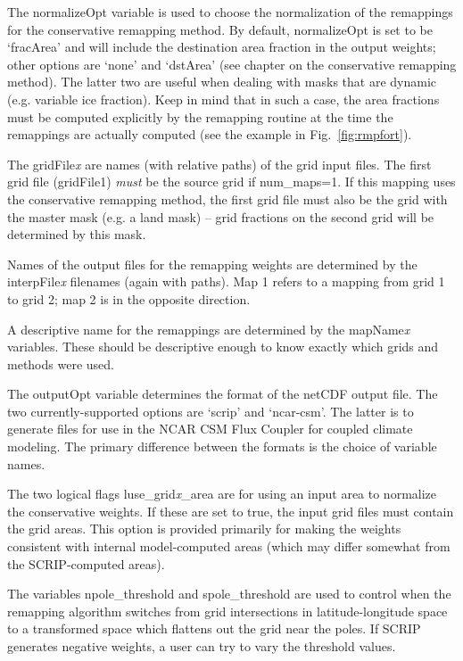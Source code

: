\documentclass[12pt]{report}
\begin{document}
The normalizeOpt variable is used to choose the normalization
of the remappings for the conservative remapping method.
By default, normalizeOpt is set to be `fracArea' and will
include the destination area fraction in the output weights;
other options are `none' and `dstArea' (see chapter on the
conservative remapping method). The latter two are useful when
dealing with masks that are dynamic (e.g. variable ice fraction).
Keep in mind that in such a case, the
area fractions must be computed explicitly by the remapping
routine at the time the remappings are actually computed
(see the example in Fig.~\ref{fig:rmpfort}).

The gridFile{\em x} are names (with relative paths) of
the grid input files.  The first grid file (gridFile1)
{\em must} be the source grid if num\_maps=1.  If this
mapping uses the conservative remapping method, the first
grid file must also be the grid with the master mask
(e.g. a land mask) -- grid fractions on the second grid
will be determined by this mask.

Names of the output files for the remapping weights are
determined by the interpFile{\em x} filenames (again
with paths).  Map 1 refers to a mapping from grid 1 to
grid 2; map 2 is in the opposite direction.

A descriptive name for the remappings are determined by
the mapName{\em x} variables.  These should be
descriptive enough to know exactly which grids and
methods were used.

The outputOpt variable determines the format of the
netCDF output file.  The two currently-supported options
are `scrip' and `ncar-csm'.  The latter is to generate
files for use in the NCAR CSM Flux Coupler for coupled
climate modeling.  The primary difference between the
formats is the choice of variable names.

The two logical flags luse\_grid{\em x}\_area are
for using an input area to normalize the conservative
weights.  If these are set to true, the input grid
files must contain the grid areas.  This option is
provided primarily for making the weights consistent
with internal model-computed areas (which may differ
somewhat from the SCRIP-computed areas).

The variables npole\_threshold and spole\_threshold are 
used to control when the remapping algorithm switches from 
grid intersections in latitude-longitude space to a 
transformed space which flattens out the grid near the poles.
If SCRIP generates negative weights, a user can try to vary 
the threshold values.
\end{document}
